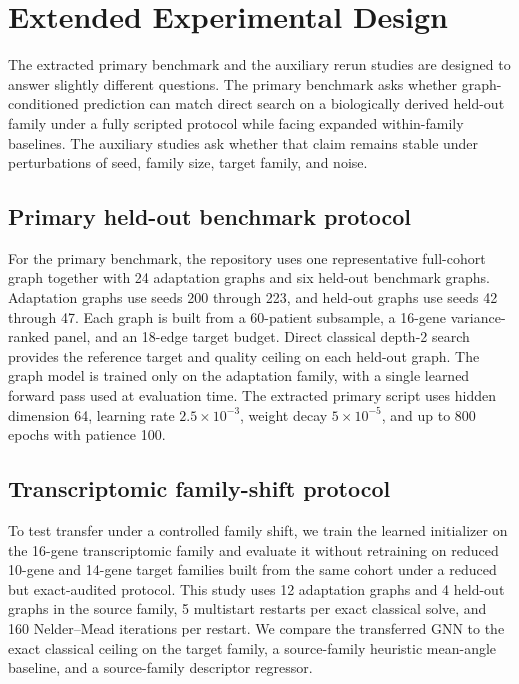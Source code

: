 \documentclass[
  reprint,
  twocolumn,
  aps,
  superscriptaddress,
  longbibliography,
  floatfix
]{revtex4-2}
\begin{document}
\section{Extended Experimental Design}
The extracted primary benchmark and the auxiliary rerun studies are designed to answer slightly different questions. The primary benchmark asks whether graph-conditioned prediction can match direct search on a biologically derived held-out family under a fully scripted protocol while facing expanded within-family baselines. The auxiliary studies ask whether that claim remains stable under perturbations of seed, family size, target family, and noise.

\subsection{Primary held-out benchmark protocol}
For the primary benchmark, the repository uses one representative full-cohort graph together with 24 adaptation graphs and six held-out benchmark graphs. Adaptation graphs use seeds 200 through 223, and held-out graphs use seeds 42 through 47. Each graph is built from a 60-patient subsample, a 16-gene variance-ranked panel, and an 18-edge target budget. Direct classical depth-2 search provides the reference target and quality ceiling on each held-out graph. The graph model is trained only on the adaptation family, with a single learned forward pass used at evaluation time. The extracted primary script uses hidden dimension 64, learning rate $2.5\times 10^{-3}$, weight decay $5\times 10^{-5}$, and up to 800 epochs with patience 100.

\subsection{Transcriptomic family-shift protocol}
To test transfer under a controlled family shift, we train the learned initializer on the 16-gene transcriptomic family and evaluate it without retraining on reduced 10-gene and 14-gene target families built from the same cohort under a reduced but exact-audited protocol. This study uses 12 adaptation graphs and 4 held-out graphs in the source family, 5 multistart restarts per exact classical solve, and 160 Nelder--Mead iterations per restart. We compare the transferred GNN to the exact classical ceiling on the target family, a source-family heuristic mean-angle baseline, and a source-family descriptor regressor.
\end{document}
